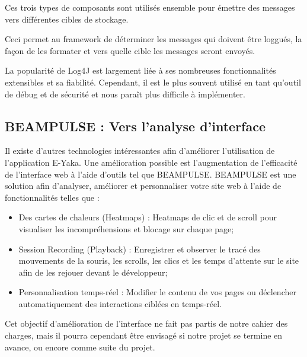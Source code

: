             Ces trois types de composants sont utilisés ensemble pour émettre des messages vers différentes cibles de stockage.

            Ceci permet au framework de déterminer les messages qui doivent être loggués, la façon de les formater et vers quelle cible les messages seront envoyés.

            La popularité de Log4J est largement liée à  ses nombreuses fonctionnalités extensibles et sa fiabilité. Cependant, il est le plus souvent utilisé en tant qu'outil de débug et de sécurité et nous paraît plus difficile à implémenter.
        
        \subsection{BEAMPULSE : Vers l'analyse d'interface}
        
            Il existe d'autres technologies intéressantes afin d'améliorer l'utilisation de l'application E-Yaka. Une  amélioration possible est l'augmentation de l'efficacité de l'interface web à l'aide d'outils tel que BEAMPULSE. BEAMPULSE est une solution afin d'analyser, améliorer et personnaliser votre site web à l'aide de fonctionnalités telles que :
            \begin{itemize}
                \item Des cartes de chaleurs (Heatmaps) : Heatmaps de clic et de scroll pour visualiser les incompréhensions et blocage sur chaque page;
                \item Session Recording (Playback) : Enregistrer et observer le tracé des mouvements de la souris, les scrolls, les clics et les temps d'attente sur le site afin de les rejouer devant le développeur;
                \item Personnalisation temps-réel : Modifier le contenu de vos pages ou déclencher automa\-tiquement des interactions ciblées en temps-réel.
            \end{itemize}
            
            Cet objectif d'amélioration de l'interface ne fait pas partis de notre cahier des charges, mais il pourra cependant être envisagé si notre projet se termine en avance, ou encore comme suite du projet.
        
